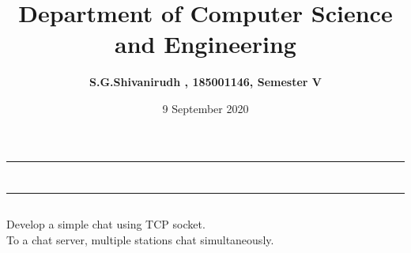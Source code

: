 \documentclass[12pt,letterpaper]{article}
\title{\textbf{Department of Computer Science and Engineering}}
\author{\textbf{S.G.Shivanirudh , 185001146, Semester V }}
\date{9 September 2020}
\begin{document}
\maketitle
\hrule
\section*{}
\hrule 
\bigskip\bigskip

\subsection*{}

\subsection*{}
\begin{flushleft}
Develop a simple chat using TCP socket.\\
To a chat server, multiple stations chat simultaneously.
\end{flushleft}

\subsection*{}
\subsubsection*{}
\begin{flushleft}

\end{flushleft}

\subsubsection*{}
\begin{flushleft}

\end{flushleft}

\subsection*{}
\subsubsection*{}
\begin{flushleft}

\end{flushleft}
\end{document}
